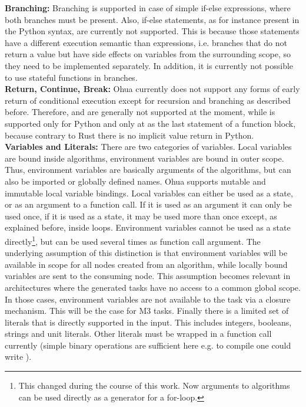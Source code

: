 \textbf{Branching:} Branching is supported in case of simple if-else expressions, where both branches must be present. Also, if-else statements, as for instance present in the Python syntax, are currently not supported. This is because those statements have a different execution semantic than expressions, i.e. branches that do not return a value but have side effects on variables from the surrounding scope, so they need to be implemented separately. In addition, it is currently not possible to use stateful functions in branches.\\

\textbf{Return, Continue, Break:} Ohua currently does not support any forms of early return of conditional execution except for recursion and branching as described before. Therefore,  and  are generally not supported at the moment, while  is supported only for Python and only at as the last statement of a function block, because contrary to Rust there is no implicit value return in Python. \\

\textbf{Variables and Literals:} There are two categories of variables. Local variables are bound inside algorithms, environment variables are bound in outer scope. Thus, environment variables are basically arguments of the algorithms, but can also be imported or globally defined names. Ohua supports mutable and immutable local variable bindings. Local variables can either be used as a state, or as an argument to a function call. If it is used as an argument it can only be used once, if it is used as a state, it may be used more than once except, as explained before, inside loops. Environment variables cannot be used as a state directly\footnote{This changed during the course of this work. Now arguments to algorithms can be used directly as a generator for a for-loop.}, but can be used several times as function call argument. The underlying assumption of this distinction is that environment variables will be available in scope for all nodes created from an algorithm, while locally bound variables are sent to the consuming node. This assumption becomes relevant in architectures where the generated tasks have no access to a common global scope. In those cases, environment variables are not available to the task via a closure mechanism. This will be the case for M3 tasks. Finally there is a limited set of literals that is directly supported in the input. This includes integers, booleans, strings and unit literals. Other literals must be wrapped in a function call currently (simple binary operations are sufficient here e.g. to compile  one could write ).\\


